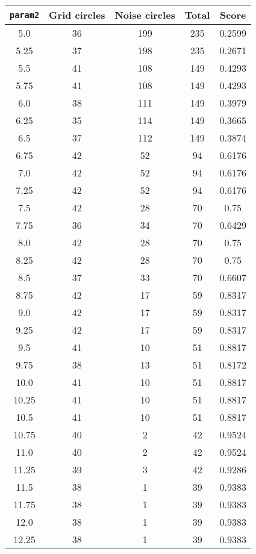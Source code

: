 \documentclass[letterpaper, 12pt]{article}
\begin{document}
\begin{longtable}{|c|c|c|c|c|}
\hline
\textbf{\texttt{param2}} & \textbf{Grid circles} & \textbf{Noise circles} & \textbf{Total} & \textbf{Score} \\
\hline
5.0 & 36 & 199 & 235 & 0.2599 \\
\hline
5.25 & 37 & 198 & 235 & 0.2671 \\
\hline
5.5 & 41 & 108 & 149 & 0.4293 \\
\hline
5.75 & 41 & 108 & 149 & 0.4293 \\
\hline
6.0 & 38 & 111 & 149 & 0.3979 \\
\hline
6.25 & 35 & 114 & 149 & 0.3665 \\
\hline
6.5 & 37 & 112 & 149 & 0.3874 \\
\hline
6.75 & 42 & 52 & 94 & 0.6176 \\
\hline
7.0 & 42 & 52 & 94 & 0.6176 \\
\hline
7.25 & 42 & 52 & 94 & 0.6176 \\
\hline
7.5 & 42 & 28 & 70 & 0.75 \\
\hline
7.75 & 36 & 34 & 70 & 0.6429 \\
\hline
8.0 & 42 & 28 & 70 & 0.75 \\
\hline
8.25 & 42 & 28 & 70 & 0.75 \\
\hline
8.5 & 37 & 33 & 70 & 0.6607 \\
\hline
8.75 & 42 & 17 & 59 & 0.8317 \\
\hline
9.0 & 42 & 17 & 59 & 0.8317 \\
\hline
9.25 & 42 & 17 & 59 & 0.8317 \\
\hline
9.5 & 41 & 10 & 51 & 0.8817 \\
\hline
9.75 & 38 & 13 & 51 & 0.8172 \\
\hline
10.0 & 41 & 10 & 51 & 0.8817 \\
\hline
10.25 & 41 & 10 & 51 & 0.8817 \\
\hline
10.5 & 41 & 10 & 51 & 0.8817 \\
\hline
10.75 & 40 & 2 & 42 & 0.9524 \\
\hline
11.0 & 40 & 2 & 42 & 0.9524 \\
\hline
11.25 & 39 & 3 & 42 & 0.9286 \\
\hline
11.5 & 38 & 1 & 39 & 0.9383 \\
\hline
11.75 & 38 & 1 & 39 & 0.9383 \\
\hline
12.0 & 38 & 1 & 39 & 0.9383 \\
\hline
12.25 & 38 & 1 & 39 & 0.9383 \\
\hline

\end{longtable}
\end{document}
